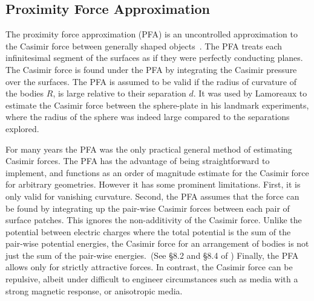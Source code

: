 \subsection{Proximity Force Approximation}

The proximity force approximation (PFA) is an uncontrolled approximation to
the Casimir force between generally shaped objects~\cite{Derjaguin1956}.  
The PFA treats each infinitesimal segment of the surfaces as if they were perfectly conducting planes.
The Casimir force is found under the PFA by integrating the Casimir pressure over the surfaces.
The PFA is assumed to be valid if the radius of curvature of the bodies $R$, is large relative to 
their separation $d$.  It was used by Lamoreaux to estimate the Casimir force between the sphere-plate
in his landmark experiments, where the radius of the sphere was indeed large compared to the separations explored. 

For many years the PFA was the only practical general method of estimating Casimir forces.
The PFA has the advantage of being straightforward to implement, and functions as an order of magnitude
estimate for the Casimir force for arbitrary geometries.
  However it has some prominent limitations.
  First, it is only valid for vanishing curvature.
 Second, the PFA assumes that the force can be found by integrating up
 the pair-wise Casimir forces between each pair of surface patches.  This ignores the non-additivity
of the Casimir force.  Unlike the potential between electric charges where the total potential is
the sum of the pair-wise potential energies, the Casimir force for an arrangement
of bodies is not just the sum of the pair-wise energies.~(See \S{8.2} and \S{8.4} of \cite{Milonni1994})
Finally, the PFA allows only for strictly attractive forces.  
In contrast, the Casimir force can be repulsive, albeit under difficult to engineer circumstances 
such as media with a strong magnetic response, or anisotropic media.


